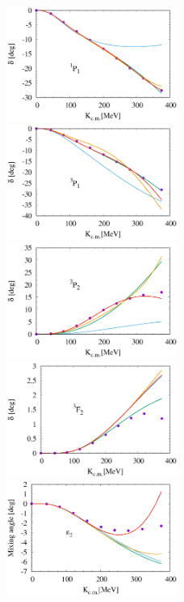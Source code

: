 \documentclass{article}
\begin{document}
\begin{figure}[htbp]

\includegraphics[width=0.5\textwidth]{6_1p1.eps}
\includegraphics[width=0.5\textwidth]{6_3p1.eps}
\includegraphics[width=0.5\textwidth]{6_3p2.eps}
\includegraphics[width=0.5\textwidth]{6_3f2.eps}
\includegraphics[width=0.5\textwidth]{6_e2.eps}

\end{figure}
\end{document}

